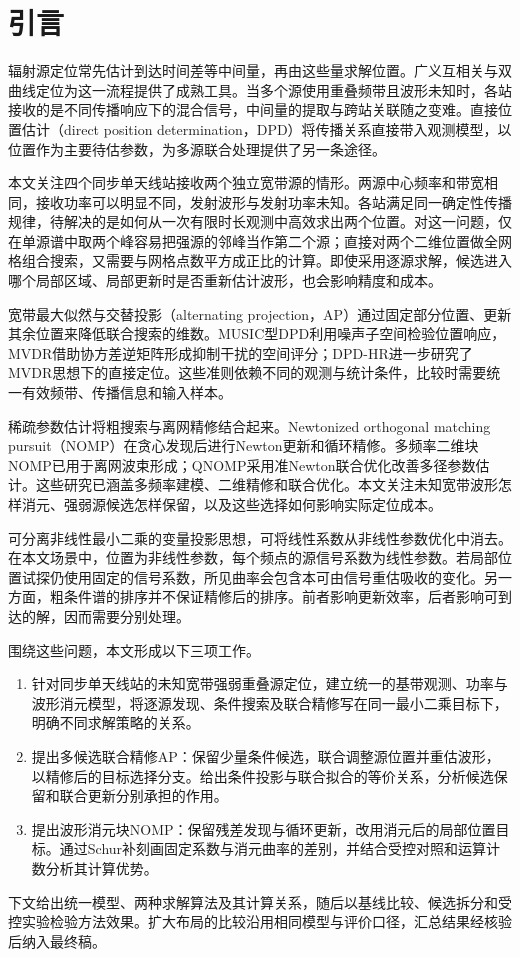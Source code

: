 \section{引言}\label{sec:introduction}
辐射源定位常先估计到达时间差等中间量，再由这些量求解位置。广义互相关与双曲线定位为这一流程提供了成熟工具\cite{KnappCarter1976,ChanHo1994}。当多个源使用重叠频带且波形未知时，各站接收的是不同传播响应下的混合信号，中间量的提取与跨站关联随之变难。直接位置估计（direct position determination，DPD）将传播关系直接带入观测模型，以位置作为主要待估参数，为多源联合处理提供了另一条途径\cite{ChenHudsonYao2002,WeissAmar2005}。

本文关注四个同步单天线站接收两个独立宽带源的情形。两源中心频率和带宽相同，接收功率可以明显不同，发射波形与发射功率未知。各站满足同一确定性传播规律，待解决的是如何从一次有限时长观测中高效求出两个位置。对这一问题，仅在单源谱中取两个峰容易把强源的邻峰当作第二个源；直接对两个二维位置做全网格组合搜索，又需要与网格点数平方成正比的计算。即使采用逐源求解，候选进入哪个局部区域、局部更新时是否重新估计波形，也会影响精度和成本。

宽带最大似然与交替投影（alternating projection，AP）通过固定部分位置、更新其余位置来降低联合搜索的维数\cite{ChenHudsonYao2002}。MUSIC型DPD利用噪声子空间检验位置响应\cite{WeissAmar2005}，MVDR借助协方差逆矩阵形成抑制干扰的空间评分\cite{Capon1969}；DPD-HR进一步研究了MVDR思想下的直接定位\cite{TirerWeiss2016}。这些准则依赖不同的观测与统计条件，比较时需要统一有效频带、传播信息和输入样本。

稀疏参数估计将粗搜索与离网精修结合起来。Newtonized orthogonal matching pursuit（NOMP）在贪心发现后进行Newton更新和循环精修\cite{Mamandipoor2016}。多频率二维块NOMP已用于离网波束形成\cite{Yang2022}；QNOMP采用准Newton联合优化改善多径参数估计\cite{Zeng2025}。这些研究已涵盖多频率建模、二维精修和联合优化。本文关注未知宽带波形怎样消元、强弱源候选怎样保留，以及这些选择如何影响实际定位成本。

可分离非线性最小二乘的变量投影思想，可将线性系数从非线性参数优化中消去\cite{GolubPereyra1973}。在本文场景中，位置为非线性参数，每个频点的源信号系数为线性参数。若局部位置试探仍使用固定的信号系数，所见曲率会包含本可由信号重估吸收的变化。另一方面，粗条件谱的排序并不保证精修后的排序。前者影响更新效率，后者影响可到达的解，因而需要分别处理。

围绕这些问题，本文形成以下三项工作。
\begin{enumerate}
  \item 针对同步单天线站的未知宽带强弱重叠源定位，建立统一的基带观测、功率与波形消元模型，将逐源发现、条件搜索及联合精修写在同一最小二乘目标下，明确不同求解策略的关系。
  \item 提出多候选联合精修AP：保留少量条件候选，联合调整源位置并重估波形，以精修后的目标选择分支。给出条件投影与联合拟合的等价关系，分析候选保留和联合更新分别承担的作用。
  \item 提出波形消元块NOMP：保留残差发现与循环更新，改用消元后的局部位置目标。通过Schur补刻画固定系数与消元曲率的差别，并结合受控对照和运算计数分析其计算优势。
\end{enumerate}

下文给出统一模型、两种求解算法及其计算关系，随后以基线比较、候选拆分和受控实验检验方法效果。扩大布局的比较沿用相同模型与评价口径，汇总结果经核验后纳入最终稿。
